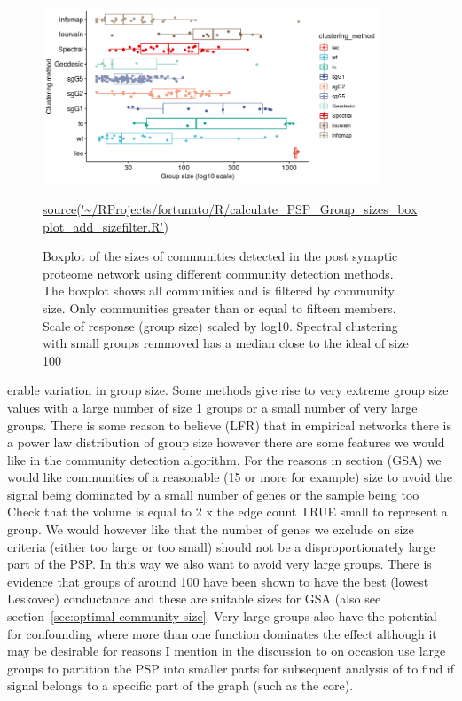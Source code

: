 \begin{figure}
    \centering
    \includegraphics[width=0.9\textwidth]{images/chapter_community_detection/ggplot2/community_sizes_PSP/Rplot_PSP_groupsizes_clustering_size_filter_fifteen.png}
    \caption{Boxplot of  
    the sizes of communities detected in the post synaptic proteome network using different community detection methods. The boxplot shows all communities and is filtered by community size. Only communities greater than or equal to fifteen members. Scale of response (group size) scaled by log10. Spectral clustering with small groups remmoved has a median close to the ideal of size 100}
    \tiny\url{source('~/RProjects/fortunato/R/calculate_PSP_Group_sizes_boxplot_add_sizefilter.R')}
    \label{fig:community_sizes_size_filter_added}
\end{figure}


erable variation in group size. Some methods give rise to very extreme group size values with a large number of size 1 groups or a small number of very large groups. There is some reason to believe (LFR) that in empirical networks there is a power law distribution of group size however there are some features we would like in the community detection algorithm. For the reasons in section (GSA) we would like communities of a reasonable (15 or more for example) size to avoid the signal being dominated by a small number of genes or the sample being too Check that the volume is equal to 2 x the edge count  TRUE 
small to represent a group. We would however like that the number of genes we exclude on size criteria (either too large or too small) should not be a disproportionately large part of the PSP. In this way we also want to avoid very large groups. There is evidence that groups of around 100 have been shown to have the best (lowest Leskovec) conductance and these are suitable sizes for GSA (also see section~\ref{sec:optimal community size}. Very large groups also have the potential for confounding where more than one function dominates the effect\cite{de2016statistical} although it may be desirable for reasons I mention in the discussion to on occasion use large groups to partition the PSP into smaller parts for subsequent analysis of to find if signal belongs to a specific part of the graph (such as the core). 

